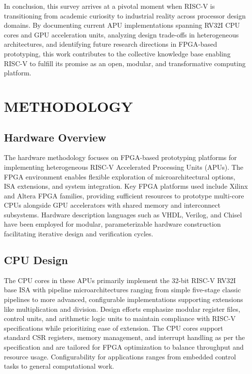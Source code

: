 \documentclass[a4paper,twoside]{article}
\begin{document}
In conclusion, this survey arrives at a pivotal moment when RISC-V is transitioning from academic curiosity to industrial reality across processor design domains. By documenting current APU implementations spanning RV32I CPU cores and GPU acceleration units, analyzing design trade-offs in heterogeneous architectures, and identifying future research directions in FPGA-based prototyping, this work contributes to the collective knowledge base enabling RISC-V to fulfill its promise as an open, modular, and transformative computing platform.



\section{\uppercase{Methodology}}

\subsection{Hardware Overview}

The hardware methodology focuses on FPGA-based prototyping platforms for implementing heterogeneous RISC-V Accelerated Processing Units (APUs). The FPGA environment enables flexible exploration of microarchitectural options, ISA extensions, and system integration. Key FPGA platforms used include Xilinx and Altera FPGA families, providing sufficient resources to prototype multi-core CPUs alongside GPU accelerators with shared memory and interconnect subsystems. Hardware description languages such as VHDL, Verilog, and Chisel have been employed for modular, parameterizable hardware construction facilitating iterative design and verification cycles.

\subsection{CPU Design}

The CPU cores in these APUs primarily implement the 32-bit RISC-V RV32I base ISA with pipeline microarchitectures ranging from simple five-stage classic pipelines to more advanced, configurable implementations supporting extensions like multiplication and division. Design efforts emphasize modular register files, control units, and arithmetic logic units to maintain compliance with RISC-V specifications while prioritizing ease of extension. The CPU cores support standard CSR registers, memory management, and interrupt handling as per the specification and are tailored for FPGA optimization to balance throughput and resource usage. Configurability for applications ranges from embedded control tasks to general computational work.
\end{document}
